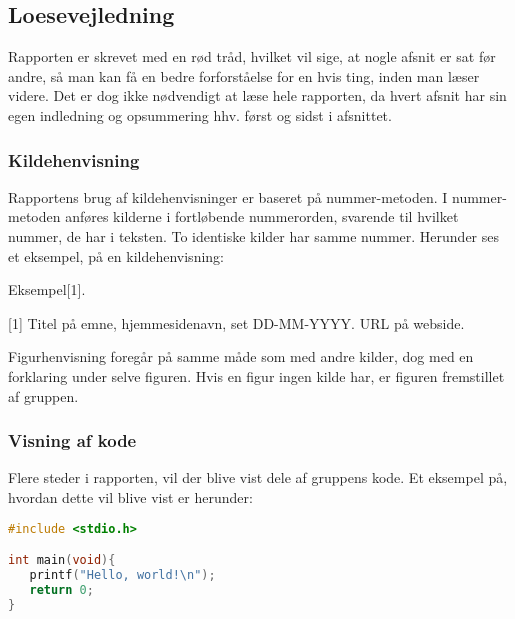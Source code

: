 \subsection{Loesevejledning}
Rapporten er skrevet med en rød tråd, hvilket vil sige, at nogle afsnit er sat før andre, så man kan få en bedre forforståelse for en hvis ting, inden man læser videre. Det er dog ikke nødvendigt at læse hele rapporten, da hvert afsnit har sin egen indledning og opsummering hhv. først og sidst i afsnittet.


\subsubsection{Kildehenvisning}
Rapportens brug af kildehenvisninger er baseret på nummer-metoden. I nummer-metoden anføres kilderne i fortløbende nummerorden, svarende til hvilket nummer, de har i teksten. To identiske kilder har samme nummer. Herunder ses et eksempel, på en kildehenvisning:

Eksempel[1].

[1] Titel på emne, hjemmesidenavn, set DD-MM-YYYY.
	URL på webside.

Figurhenvisning foregår på samme måde som med andre kilder, dog med en forklaring under selve figuren. Hvis en figur ingen kilde har, er figuren fremstillet af gruppen.


\subsubsection{Visning af kode}
Flere steder i rapporten, vil der blive vist dele af gruppens kode. Et eksempel på, hvordan dette vil blive vist er herunder:

\begin{lstlisting}[language=C, caption=Kodeeksempel i C]
#include <stdio.h>

int main(void){
   printf("Hello, world!\n");
   return 0;
}
\end{lstlisting}